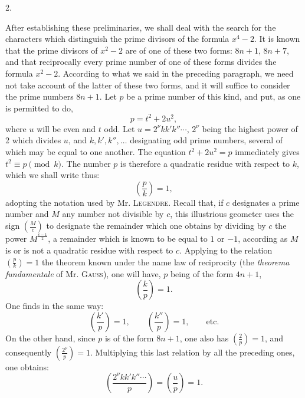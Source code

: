 \documentclass[11pt]{article}
\newcommand{\leg}[2]{\left(\frac{#1}{#2}\right)}
\newcommand{\unitid}[1]{\hypertarget{#1}{}}
\begin{document}
\begin{center}2.\end{center}

\unitid{dirichlet.v1.p04a.en.par.008}After establishing these preliminaries, we shall deal with the search for the characters which distinguish the prime divisors of the formula $x^4-2$. It is known that the prime divisors of $x^2-2$ are of one of these two forms: $8n+1$, $8n+7$, and that reciprocally every prime number of one of these forms divides the formula $x^2-2$. According to what we said in the preceding paragraph, we need not take account of the latter of these two forms, and it will suffice to consider the prime numbers $8n+1$. Let $p$ be a prime number of this kind, and put, as one is permitted to do,
\[
 p=t^2+2u^2,
\]
where $u$ will be even and $t$ odd. Let $u=2^\nu kk'k''\cdots$, $2^\nu$ being the highest power of 2 which divides $u$, and $k,k',k'',\ldots$ designating odd prime numbers, several of which may be equal to one another. The equation $t^2+2u^2=p$ immediately gives $t^2\equiv p\pmod k$. The number $p$ is therefore a quadratic residue with respect to $k$, which we shall write thus:
\[
 \leg{p}{k}=1,
\]
adopting the notation used by Mr. \textsc{Legendre}. Recall that, if $c$ designates a prime number and $M$ any number not divisible by $c$, this illustrious geometer uses the sign $\leg{M}{c}$ to designate the remainder which one obtains by dividing by $c$ the power $M^{\frac{c-1}{2}}$, a remainder which is known to be equal to $1$ or $-1$, according as $M$ is or is not a quadratic residue with respect to $c$. Applying to the relation $\leg{p}{k}=1$ the theorem known under the name law of reciprocity (the \emph{theorema fundamentale} of Mr. \textsc{Gauss}), one will have, $p$ being of the form $4n+1$,
\[
 \leg{k}{p}=1.
\]
One finds in the same way:
\[
 \leg{k'}{p}=1,\qquad \leg{k''}{p}=1,\qquad \text{etc.}
\]
On the other hand, since $p$ is of the form $8n+1$, one also has $\leg{2}{p}=1$, and consequently $\leg{2^\nu}{p}=1$. Multiplying this last relation by all the preceding ones, one obtains:
\[
 \leg{2^\nu kk'k''\cdots}{p}=\leg{u}{p}=1.
\]
\end{document}
